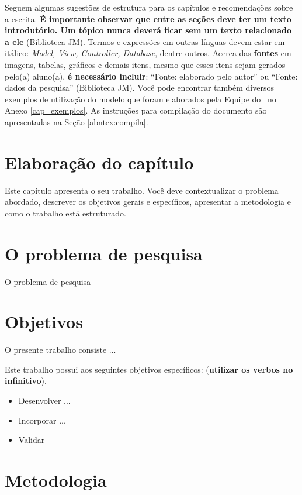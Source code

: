 Seguem algumas sugestões de estrutura para os capítulos e recomendações sobre a escrita. \textbf{É importante observar que entre as seções deve ter um texto introdutório. Um tópico nunca deverá ficar sem um texto relacionado a ele} (Biblioteca JM). Termos e expressões em outras línguas devem estar em itálico: \textit{Model, View, Controller, Database}, dentre outros. Acerca das \textbf{fontes} em imagens, tabelas, gráficos e demais itens, mesmo que esses itens sejam gerados pelo(a) aluno(a), \textbf{é necessário incluir}: ``Fonte: elaborado pelo autor'' ou ``Fonte: dados da pesquisa'' (Biblioteca JM). Você pode encontrar também diversos exemplos de utilização do modelo que foram elaborados pela Equipe do \abnTeX\ no Anexo \ref{cap_exemplos}. As instruções para compilação do documento são apresentadas na Seção \ref{abntex:compila}.


\section{Elaboração do capítulo}

Este capítulo apresenta o seu trabalho. Você deve contextualizar o problema abordado, descrever os objetivos gerais e específicos, apresentar a metodologia e como o trabalho está estruturado.

\section{O problema de pesquisa}
\label{sec:problema}

O problema de pesquisa

\section{Objetivos}
\label{sec:objetivos}

O presente trabalho consiste ...

Este trabalho possui aos seguintes objetivos específicos: (\textbf{utilizar os verbos no infinitivo}).

\begin{itemize}
	\item Desenvolver ...
	\item Incorporar ...
	\item Validar
\end{itemize}

\section{Metodologia}
\label{sec:metodologia}

